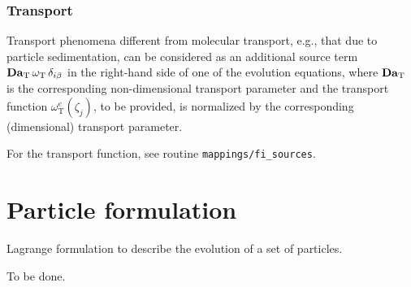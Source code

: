 
\subsubsection{Transport}

Transport phenomena different from molecular transport, e.g., that due to particle sedimentation, can be considered as an additional source term $\mathrm{\bf Da}_\mathrm{T}\,\omega_\mathrm{T}\,\delta_{i\beta}$ in the right-hand side of one of the evolution equations, where $\mathrm{\bf Da}_\mathrm{T}$ is the corresponding non-dimensional transport parameter and the transport function $\omega_\mathrm{T}^e(\zeta_j)$, to be provided, is normalized by the corresponding (dimensional) transport parameter.

For the transport function, see routine {\tt mappings/fi\_sources}.

\section{Particle formulation}

Lagrange formulation to describe the evolution of a set of particles.

To be done.